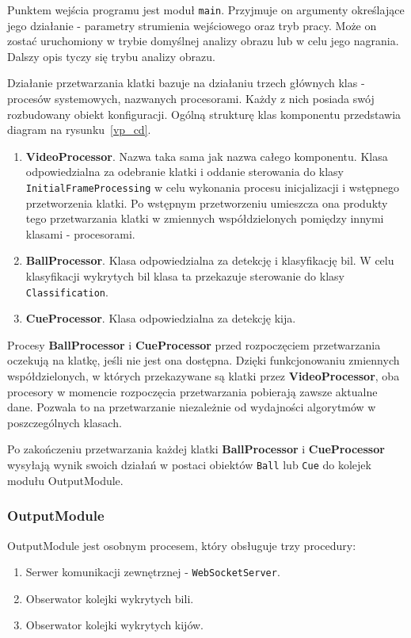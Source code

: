 \documentclass[12pt]{article}
\begin{document}
Punktem wejścia programu jest moduł \lstinline{main}. Przyjmuje on argumenty określające jego działanie - parametry strumienia wejściowego oraz tryb pracy. Może on zostać uruchomiony w trybie domyślnej analizy obrazu lub w celu jego nagrania. Dalszy opis tyczy się trybu analizy obrazu.

Działanie przetwarzania klatki bazuje na działaniu trzech głównych klas - procesów systemowych, nazwanych procesorami. Każdy z nich posiada swój rozbudowany obiekt konfiguracji. Ogólną strukturę klas komponentu przedstawia diagram na rysunku~\ref{vp_cd}.

\begin{enumerate}
    \item \textbf{VideoProcessor}. Nazwa taka sama jak nazwa całego komponentu. Klasa odpowiedzialna za odebranie klatki i oddanie sterowania do klasy \lstinline{InitialFrameProcessing} w celu wykonania procesu inicjalizacji i wstępnego przetworzenia klatki. Po wstępnym przetworzeniu umieszcza ona produkty tego przetwarzania klatki w zmiennych współdzielonych pomiędzy innymi klasami - procesorami.
    \item \textbf{BallProcessor}. Klasa odpowiedzialna za detekcję i klasyfikację bil. W celu klasyfikacji wykrytych bil klasa ta przekazuje sterowanie do klasy \lstinline{Classification}.
    \item \textbf{CueProcessor}. Klasa odpowiedzialna za detekcję kija. %
\end{enumerate}

Procesy \textbf{BallProcessor} i \textbf{CueProcessor} przed rozpoczęciem przetwarzania oczekują na klatkę, jeśli nie jest ona dostępna. Dzięki funkcjonowaniu zmiennych współdzielonych, w których przekazywane są klatki przez \textbf{VideoProcessor}, oba procesory w momencie rozpoczęcia przetwarzania pobierają zawsze aktualne dane. Pozwala to na przetwarzanie niezależnie od wydajności algorytmów w poszczególnych klasach.

Po zakończeniu przetwarzania każdej klatki \textbf{BallProcessor} i \textbf{CueProcessor} wysyłają wynik swoich działań w postaci obiektów \lstinline{Ball} lub \lstinline{Cue} do kolejek modułu OutputModule.

\subsubsection{OutputModule}

OutputModule jest osobnym procesem, który obsługuje trzy procedury:
\begin{enumerate} [noitemsep]
    \item Serwer komunikacji zewnętrznej - \lstinline{WebSocketServer}.
    \item Obserwator kolejki wykrytych bili.
    \item Obserwator kolejki wykrytych kijów.
\end{enumerate}
\end{document}
